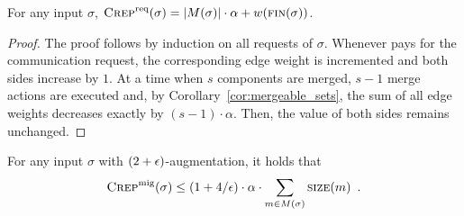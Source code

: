 \begin{lemma}
\label{lem:crep_req}
For any input $\sigma$, $\textsc{Crep}^\textnormal{req}(\sigma) = |M(\sigma)| \cdot \alpha + w(\textsc{fin}(\sigma))$.
\end{lemma}

\begin{proof}
The proof follows by induction on all requests of $\sigma$. Whenever \CREP
pays for the communication request, the corresponding edge weight is incremented
and both sides increase by $1$. At a time when $s$ components are merged, $s-1$
merge actions are executed and, by Corollary~\ref{cor:mergeable_sets}, the sum of all
edge weights decreases exactly by $(s-1) \cdot \alpha$. Then, the value of both
sides remains unchanged.
\end{proof}

\begin{lemma}
\label{lem:crep_mig}
For any input $\sigma$ with $(2+\epsilon)$-augmentation, it holds that
\[
\textsc{Crep}^\textnormal{mig}(\sigma) \leq (1+4/\epsilon) \cdot \alpha \cdot \sum_{m \in M(\sigma)} \textsc{size}(m)\enspace.
\]
\end{lemma}

